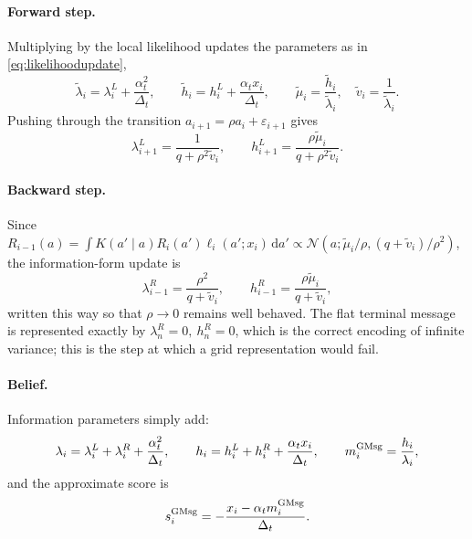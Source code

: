 \documentclass[11pt]{article}
\newcommand{\Normal}{\mathcal{N}}
\newcommand{\dint}{\,\mathrm{d}}
\begin{document}
\paragraph{Forward step.} Multiplying by the local likelihood updates the parameters as
in \eqref{eq:likelihoodupdate},
\begin{equation}
  \widetilde\lambda_i=\lambda_i^L+\frac{\alpha_t^2}{\Delta_t},
  \qquad
  \widetilde h_i=h_i^L+\frac{\alpha_t x_i}{\Delta_t},
  \qquad
  \widetilde\mu_i=\frac{\widetilde h_i}{\widetilde\lambda_i},
  \quad
  \widetilde v_i=\frac1{\widetilde\lambda_i}.
\end{equation}
Pushing through the transition \(a_{i+1}=\rho a_i+\varepsilon_{i+1}\) gives
\begin{equation}
  \lambda_{i+1}^L=\frac1{q+\rho^2\widetilde v_i},
  \qquad
  h_{i+1}^L=\frac{\rho\widetilde\mu_i}{q+\rho^2\widetilde v_i}.
  \label{eq:forwardclosure}
\end{equation}

\paragraph{Backward step.} Since
\(R_{i-1}(a)=\int K(a'\mid a)R_i(a')\ell_i(a';x_i)\dint a'
\propto\Normal\!\left(a;\widetilde\mu_i/\rho,(q+\widetilde v_i)/\rho^2\right)\),
the information-form update is
\begin{equation}
  \lambda_{i-1}^R=\frac{\rho^2}{q+\widetilde v_i},
  \qquad
  h_{i-1}^R=\frac{\rho\widetilde\mu_i}{q+\widetilde v_i},
\end{equation}
written this way so that \(\rho\to0\) remains well behaved. The flat terminal message is
represented exactly by \(\lambda_{n}^R=0,\ h_n^R=0\), which is the correct encoding of
infinite variance; this is the step at which a grid representation would fail.

\paragraph{Belief.} Information parameters simply add:
\begin{equation}
  \lambda_i=\lambda_i^L+\lambda_i^R+\frac{\alpha_t^2}{\Delta_t},
  \qquad
  h_i=h_i^L+h_i^R+\frac{\alpha_t x_i}{\Delta_t},
  \qquad
  m_i^{\rm GMsg}=\frac{h_i}{\lambda_i},
\end{equation}
and the approximate score is
\begin{equation}
  s_i^{\rm GMsg}
  = -\frac{x_i-\alpha_t m_i^{\rm GMsg}}{\Delta_t}.
\end{equation}
\end{document}
